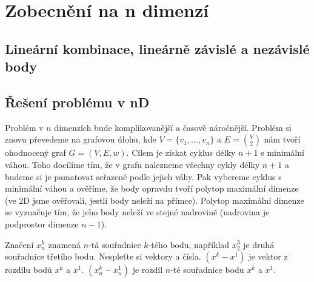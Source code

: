 \chapter{Zobecnění na n dimenzí}
\label{chap:n_dimenzi}

\section{Lineární kombinace, lineárně závislé a nezávislé body}



\section{Řešení problému v nD}
Problém v $n$ dimenzích bude komplikovanější a časově náročnější. Problém si znovu převedeme na grafovou úlohu, kde $V = \{v_1,\ldots, v_n\}$ a $E = \binom{V}{2}$ nám tvoří ohodnocený graf $G = (V, E, w)$. Cílem je získat cyklus délky $n+1$ s minimální váhou. Toho docílíme tím, že v grafu nalezneme všechny cykly délky $n+1$ a budeme si je pamatovat seřazené podle jejich váhy. Pak vybereme cyklus s minimální váhou a ověříme, že body opravdu tvoří polytop maximální dimenze (ve 2D jsme ověřovali, jestli body neleží na přímce). Polytop maximální dimenze se vyznačuje tím, že jeho body neleží ve stejné nadrovině (nadrovina je podprostor dimenze $n-1$). 
\begin{poznamka} 
  \label{poznamka:varovani_index}
  Značení $x^k_n$ znamená $n$-tá souřadnice $k$-tého bodu, například $x^3_2$ je druhá souřadnice třetího bodu. Nespleťte si vektory a čísla. $(x^k-x^1)$ je vektor z rozdílu bodů $x^k$ a $x^1$. $(x^k_n - x^1_n)$ je rozdíl $n$-té souřadnice bodu $x^k$ a $x^1$. 
\end{poznamka}

